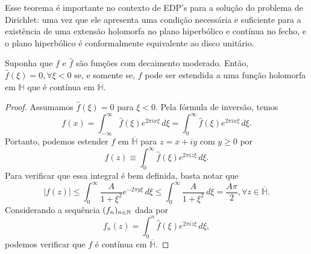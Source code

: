         Esse teorema é importante no contexto de EDP's para a solução
        do problema de Dirichlet: uma vez que ele apresenta uma condição
        necessária e suficiente para a existência de uma extensão holomorfa
        no plano hiperbólico e contínua no fecho, e o plano hiperbólico é
        conformalmente equivalente ao disco unitário.
        \begin{teorema}
            Suponha que $f$ e $\widehat{f}$ são funções com decaimento
            moderado. Então, $\widehat{f}(\xi) = 0, \forall \xi < 0$ se,
            e somente se, $f$ pode ser estendida a uma função holomorfa
            em $\mathbb{H}$ que é contínua em $\overline{\mathbb{H}}$.
        \end{teorema}
        \begin{proof}
            Assumamos $\widehat{f}(\xi) = 0$ para $\xi < 0$.
            Pela fórmula de inversão, temos
            \begin{equation*}
                f(x) = \int_{-\infty}^{\infty} 
                \widehat{f}(\xi)e^{2\pi ix\xi} \, d\xi =
                \int_{0}^{\infty} 
                \widehat{f}(\xi)e^{2\pi ix\xi} \, d\xi.
            \end{equation*}
            Portanto, podemos estender $f$ em $\overline{\mathbb{H}}$ para 
            $z = x+iy$ com $y\geq 0$ por
            \begin{equation*}
                f(z) \equiv \int_{0}^{\infty} 
                \widehat{f}(\xi)e^{2\pi iz\xi} \, d\xi.
            \end{equation*}
            Para verificar que essa integral é bem definida, basta
            notar que
            \begin{equation*}
                |f(z)| \leq \int_{0}^{\infty} 
                \frac{A}{1+ \xi^2}e^{-2\pi y\xi} \, d\xi
                \leq \int_{0}^{\infty} 
                \frac{A}{1+ \xi^2} \, d\xi
                = \frac{A\pi}{2}, 
                \forall z\in\overline{\mathbb{H}}.
            \end{equation*}
            Considerando a sequência $(f_n)_{n\in\mathbb{N}}$ dada por
            \begin{equation*}
                f_n(z) = \int_0^n \widehat{f}(\xi)e^{2\pi iz\xi} \, d\xi,
            \end{equation*}
            podemos verificar que $f$ é contínua em 
            $\overline{\mathbb{H}}$.
            

\end{proof}
